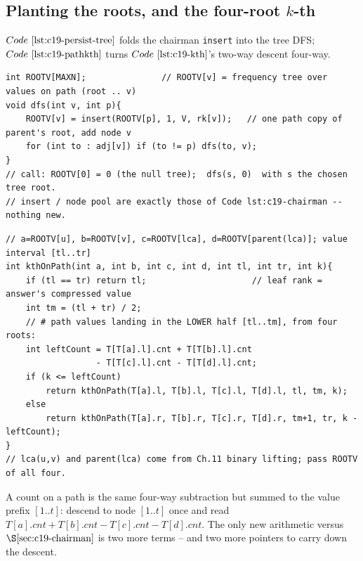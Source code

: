 \subsection{Planting the roots, and the four-root \(k\)-th}

\(\coderef{c19-persist-tree}\) folds the chairman \texttt{insert} into the tree DFS; \(\coderef{c19-pathkth}\) turns \(\coderef{c19-kth}\)'s two-way descent four-way.

\begin{lstlisting}[caption={plant one frequency root per tree node: each DFS step path-copies the parent root and inserts the node's own value rank}, label={lst:c19-persist-tree}]
int ROOTV[MAXN];               // ROOTV[v] = frequency tree over values on path (root .. v)
void dfs(int v, int p){
    ROOTV[v] = insert(ROOTV[p], 1, V, rk[v]);   // one path copy of parent's root, add node v
    for (int to : adj[v]) if (to != p) dfs(to, v);
}
// call: ROOTV[0] = 0 (the null tree);  dfs(s, 0)  with s the chosen tree root.
// insert / node pool are exactly those of Code lst:c19-chairman -- nothing new.
\end{lstlisting}

\begin{lstlisting}[caption={k-th smallest value on the path u--v: descend four roots at once, the LCA and its parent being the two subtracted ones}, label={lst:c19-pathkth}]
// a=ROOTV[u], b=ROOTV[v], c=ROOTV[lca], d=ROOTV[parent(lca)]; value interval [tl..tr]
int kthOnPath(int a, int b, int c, int d, int tl, int tr, int k){
    if (tl == tr) return tl;                     // leaf rank = answer's compressed value
    int tm = (tl + tr) / 2;
    // # path values landing in the LOWER half [tl..tm], from four roots:
    int leftCount = T[T[a].l].cnt + T[T[b].l].cnt
                  - T[T[c].l].cnt - T[T[d].l].cnt;
    if (k <= leftCount)
        return kthOnPath(T[a].l, T[b].l, T[c].l, T[d].l, tl, tm, k);
    else
        return kthOnPath(T[a].r, T[b].r, T[c].r, T[d].r, tm+1, tr, k - leftCount);
}
// lca(u,v) and parent(lca) come from Ch.11 binary lifting; pass ROOTV of all four.
\end{lstlisting}

A count on a path is the same four-way subtraction but summed to the value prefix \([1..t]\): descend to node \([1..t]\) once and read \(T[a].\mathit{cnt}+T[b].\mathit{cnt}-T[c].\mathit{cnt}-T[d].\mathit{cnt}\). The only new arithmetic versus \(\secref{c19-chairman}\) is two more terms -- and two more pointers to carry down the descent.

